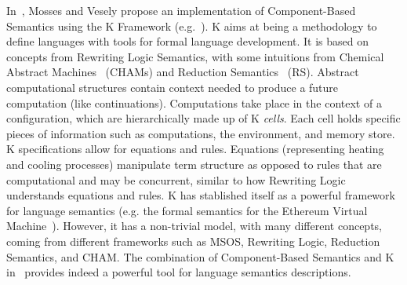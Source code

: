 \documentclass[a4paper,openany]{book}
\begin{document}
In~\cite{10.1007/978-3-319-12904-4-12}, Mosses and Vesely propose an implementation of Com\-po\-nent-Based Semantics using the K Framework (e.g.~\cite{rosu-serbanuta-2010-jlap}). K aims at being a methodology to define languages with tools for formal language development.
It is based on concepts from Rewriting Logic Semantics, with some intuitions from Chemical Abstract Machines~\cite{BERRY1992217} (CHAMs) and Reduction Semantics~\cite{FELLEISEN1992235} (RS). Abstract computational structures contain context needed to produce a future computation (like continuations).
Computations take place in the context of a configuration, which are hierarchically made up of K \emph{cells}. Each cell holds specific pieces of information such as computations, the environment, and memory store. 
K specifications allow for equations and rules. Equations (representing heating and cooling processes) manipulate term structure as opposed to rules that are computational and may be concurrent, similar to how Rewriting Logic understands equations and rules. K has stablished itself as a powerful framework for language semantics (e.g. the formal semantics for the Ethereum Virtual Machine~\cite{kevm}). However, it has a non-trivial model, with many different concepts, coming from different frameworks such as MSOS, Rewriting Logic, Reduction Semantics, and CHAM. 
The combination of Component-Based Semantics and K in~\cite{10.1007/978-3-319-12904-4-12} provides indeed a powerful tool for language semantics descriptions.
\end{document}
